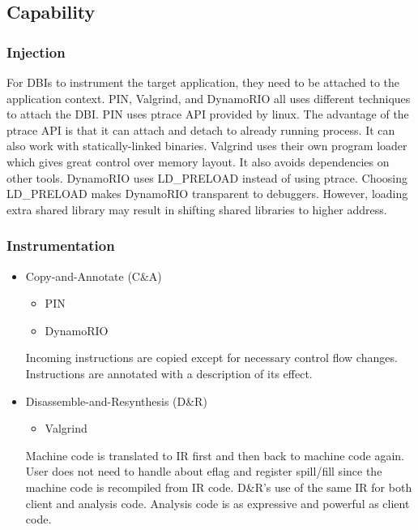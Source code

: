 \subsection{Capability}
\subsubsection{Injection}

For DBIs to instrument the target application, they need to be
attached to the application context. PIN, Valgrind, and DynamoRIO all
uses different techniques to attach the DBI. PIN uses ptrace API
provided by linux. The advantage of the ptrace API is that it can
attach and detach to already running process. It can also work with
statically-linked binaries. Valgrind uses their own program loader
which gives great control over memory layout. It also avoids
dependencies on other tools. DynamoRIO uses LD\_PRELOAD instead of
using ptrace. Choosing LD\_PRELOAD makes DynamoRIO transparent to
debuggers. However, loading extra shared library may result in
shifting shared libraries to higher address.

\subsubsection{Instrumentation}
\begin{itemize}
	\item Copy-and-Annotate (C\&A)
	\begin{itemize}
		\item PIN
		\item DynamoRIO
	\end{itemize}
	Incoming instructions are copied except for necessary control flow changes.
	Instructions are annotated with a description of its effect.
	\item Disassemble-and-Resynthesis (D\&R)
	\begin{itemize}
		\item Valgrind
	\end{itemize}
	Machine code is translated to IR first and then back to machine code again.
	User does not need to handle about eflag and register spill/fill since the machine code is recompiled from IR code.
	D\&R's  use of the same IR for both client and analysis code.
	Analysis code is as expressive and powerful as client code.
\end{itemize}
